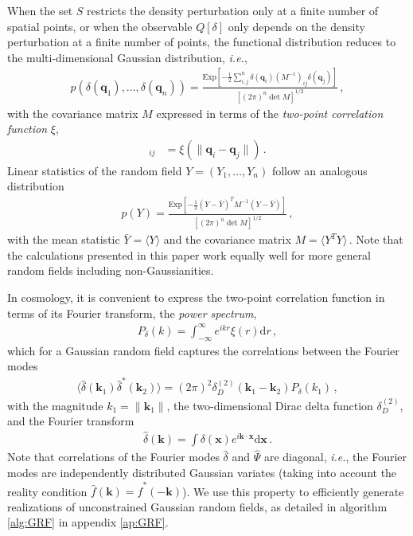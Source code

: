 \documentclass[a4paper, 11pt]{article}
\begin{document}
When the set $S$ restricts the density perturbation only at a finite number of spatial points, or when the observable $Q[\delta]$ only depends on the density perturbation at a finite number of points, the functional distribution reduces to the multi-dimensional Gaussian distribution, \textit{i.e.},
\begin{align}
p(\delta(\bm{q}_1), \dots, \delta(\bm{q}_n)) = \frac{\text{Exp}\left[-\frac{1}{2} \sum_{i,j}^n \delta(\bm{q}_i) (M^{-1})_{ij}\delta(\bm{q}_j)\right]}{[(2\pi)^n \det M]^{1/2}}\,,
\end{align}
with the covariance matrix $M$ expressed in terms of the \textit{two-point correlation function} $\xi$,
\begin{align}
[M]_{ij} &= \xi(\|\bm{q}_i - \bm{q}_j\|)\,.
\end{align} 
Linear statistics of the random field $Y=(Y_1,\dots,Y_n)$ follow an analogous distribution
\begin{align}
p(Y) = \frac{\text{Exp}\left[-\frac{1}{2} (Y-\bar{Y})^T M^{-1} (Y-\bar{Y})\right]}{[(2\pi)^n \det M]^{1/2}}\,,
\end{align}
with the mean statistic $\bar{Y} = \langle Y \rangle$ and the covariance matrix $M = \langle Y^T Y \rangle\,.$ Note that the calculations presented in this paper work equally well for more general random fields including non-Gaussianities.

In cosmology, it is convenient to express the two-point correlation function in terms of its Fourier transform, the \textit{power spectrum},
\begin{align}
P_\delta(k) = \int_{-\infty}^{\infty} e^{i k r} \xi(r)\mathrm{d}r\,,
\end{align}
which for a Gaussian random field captures the correlations between the Fourier modes
\begin{align}
\langle \hat{\delta}(\bm{k}_1) \hat{\delta}^*(\bm{k}_2)\rangle = (2\pi)^2 \delta_D^{(2)}(\bm{k}_1-\bm{k}_2) P_\delta(k_1)\,,
\end{align}
with the magnitude $k_1 = \|\bm{k}_1\|$, the two-dimensional Dirac delta function $\delta_D^{(2)}$, and the Fourier transform
\begin{align}
\hat{\delta}(\bm{k}) = \int \delta(\bm{x})e^{i\bm{k}\cdot \bm{x}}\mathrm{d}\bm{x}\,.
\end{align}
Note that correlations of the Fourier modes $\hat{\delta}$ and $\hat{\Psi}$ are diagonal, \textit{i.e.}, the Fourier modes are independently distributed Gaussian variates (taking into account the reality condition $\hat{f}(\bm{k})=\hat{f}^*(-\bm{k})$). We use this property to efficiently generate realizations of unconstrained Gaussian random fields, as detailed in algorithm \ref{alg:GRF} in appendix \ref{ap:GRF}.
\end{document}
